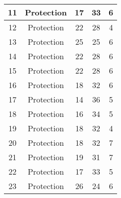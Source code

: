 \documentclass[results.tex]{subfiles}
\begin{document}
\begin{center}
\begin{tabular}{| c || c | c | c | c |}
            \hline
            11                      & Protection                   & 17                     & 33                      & 6                    \\
            \hline
            12                      & Protection                   & 22                     & 28                      & 4                    \\
            \hline
            13                      & Protection                   & 25                     & 25                      & 6                    \\
            \hline
            14                      & Protection                   & 22                     & 28                      & 6                    \\
            \hline
            15                      & Protection                   & 22                     & 28                      & 6                    \\
            \hline
            16                      & Protection                   & 18                     & 32                      & 6                    \\
            \hline
            17                      & Protection                   & 14                     & 36                      & 5                    \\
            \hline
            18                      & Protection                   & 16                     & 34                      & 5                    \\
            \hline
            19                      & Protection                   & 18                     & 32                      & 4                    \\
            \hline
            20                      & Protection                   & 18                     & 32                      & 7                    \\
            \hline
            21                      & Protection                   & 19                     & 31                      & 7                    \\
            \hline
            22                      & Protection                   & 17                     & 33                      & 5                    \\
            \hline
            23                      & Protection                   & 26                     & 24                      & 6                    \\

\end{tabular}
\end{center}
\end{document}
